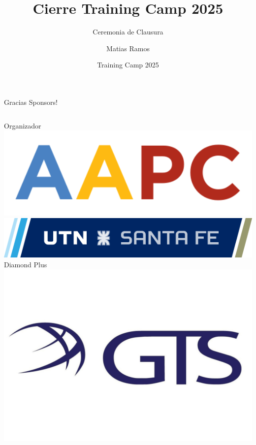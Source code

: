 \documentclass{beamer}
\title %
{Cierre Training Camp 2025}
\subtitle{Ceremonia de Clausura}
\author[Matias Ramos]{Matias Ramos}
\institute[]{Universidad Tecnológica Nacional - Facultad Regional Santa Fe}
\date[TC 2025]{Training Camp 2025}
\begin{document}
\frame{\titlepage}





\begin{frame}{Gracias Sponsors!}
    \begin{columns}[t]
        \centering
        Organizador\\
        \vspace{0.5cm}
        \includegraphics[width=1\textwidth,keepaspectratio]{logos/aapc.png}
        \includegraphics[width=1\textwidth,keepaspectratio]{logos/utn_santafe.png}
        \centering
        Diamond Plus\\
        \includegraphics[width=1\textwidth,keepaspectratio]{logos/GTSlogo.jpeg}
    \end{columns}
\end{frame}
\end{document}
